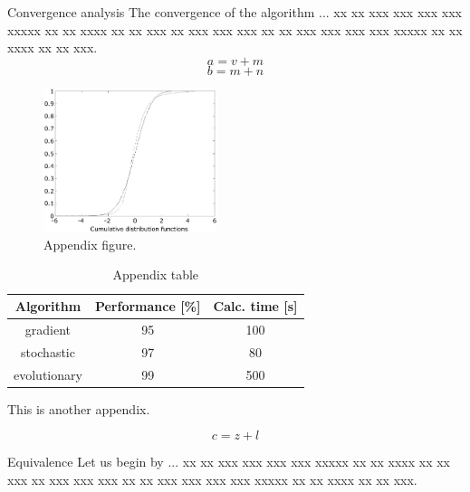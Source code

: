 \documentclass{amcs}
\begin{document}

\begin{appendices}{Convergence analysis}
 The convergence of the algorithm ... xx xx
 xxx xxx xxx xxx xxxxx xx xx xxxx xx xx xxx
 xx xxx xxx xxx xx xx  xxx xxx xxx xxx xxxxx
 xx xx xxxx xx xx xxx.
\begin{equation}
  a=v+m
\end{equation}
\begin{equation}
  b=m+n
\end{equation}
\begin{figure}[!h]
  \includegraphics[width=0.45\textwidth]{figA1}
  \caption{Appendix figure.}
\end{figure}
\begin{table}[!h]
 \caption{Appendix table}
 \begin{tabular}{|c|c|c|}
   \hline
   Algorithm & Performance [\%]& Calc. time [s]\\\hline\hline
   gradient & 95 & 100\\
   stochastic & 97 & 80\\
   evolutionary & 99 & 500\\\hline
 \end{tabular}
\end{table}

\begin{theorem}{}
\end{theorem}

\begin{lemma}{}
\end{lemma}

\begin{lemma}{}
\end{lemma}

\begin{lemma}{}
\end{lemma}
\end{appendices}

\begin{appendices}{}

This is another appendix.

\begin{equation}
  c=z+l
\end{equation}

\begin{lemma}{Equivalence} Let us begin by ... xx xx
 xxx xxx xxx xxx xxxxx xx xx xxxx xx xx xxx
 xx xxx xxx xxx xx xx  xxx xxx xxx xxx xxxxx
 xx xx xxxx xx xx xxx.
\end{lemma}

\end{appendices}

\makeinfo
\end{document}
